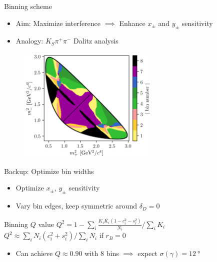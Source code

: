 \documentclass{beamer}
\begin{document}
\begin{frame}{Binning scheme}
  \begin{itemize}
    \setlength\itemsep{1.3em}
    \item{Aim: Maximize interference $\implies$ Enhance $x_\pm$ and $y_\pm$ sensitivity}
    \item{Analogy: $K_S\pi^+\pi^-$ Dalitz analysis}
  \end{itemize}
  \begin{figure}
    \centering
    \includegraphics[width = 0.6\textwidth]{DalitzKSpipi.png}
  \end{figure}
\end{frame}

\begin{frame}{Backup: Optimize bin widths}
  \begin{itemize}
    \item{Optimize $x_\pm$, $y_\pm$ sensitivity}
    \item{Vary bin edges, keep symmetric around $\delta_D = 0$}
  \end{itemize}
  \begin{block}{Binning $Q$ value}
    $Q^2 = 1 - \sum_i\frac{K_i\bar{K_i}(1 - c_i^2 - s_i^2)}{N_i}\Big/\sum_iK_i$ \\
    $Q^2\approx\sum_iN_i(c_i^2 + s_i^2)\Big/\sum_iN_i$ if $r_B = 0$
  \end{block}
  \begin{itemize}
    \item{Can achieve $Q\approx0.90$ with $8$ bins $\implies$ expect $\sigma(\gamma) = \SI{12}{\degree}$}
  \end{itemize}
\end{frame}
\end{document}

